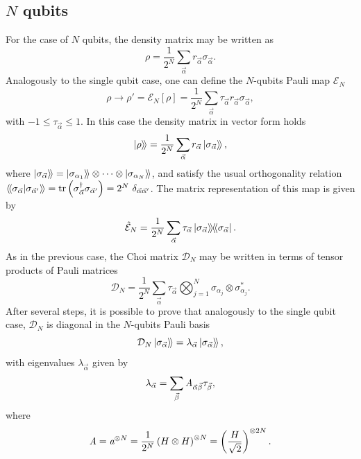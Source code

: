 \subsection{$N$ qubits} %
% 
For the case of $N$ qubits, the density matrix may be written as
% 
\begin{equation}
\rho=\frac{1}{2^N}\sum_{\vec{\alpha}} r_{\vec{\alpha}} \sigma_{\vec{\alpha}}.
\end{equation}
% 
Analogously to the single qubit case, one can define the $N$-qubits Pauli map $\mathcal{E}_N$
% 
\begin{equation}
\rho \to \rho'=\mathcal{E}_N[\rho ]=\frac{1}{2^N}\sum_{\vec{\alpha}} \tau_{\vec{\alpha}} r_{\vec{\alpha}} \sigma_{\vec{\alpha}},
\end{equation}
% 
with $-1\leq \tau_{\vec{\alpha}} \leq 1$. 
% 
In this case the density matrix in vector form holds 
% 
\begin{equation}
 \mathinner{|{\rho}\rangle \! \rangle}=\frac{1}{2^N}\sum_{\vec{\alpha}} r_{\vec{\alpha}} \mathinner{|{\sigma_{\vec{\alpha}} }\rangle \! \rangle},
\end{equation}
% 
where $\mathinner{|{\sigma_{\vec{\alpha} }}\rangle \! \rangle}=\mathinner{|{\sigma_{\alpha_1}}\rangle \! \rangle}\otimes\dots \otimes\mathinner{|{\sigma_{\alpha_N}}\rangle \! \rangle}$, and satisfy the usual orthogonality relation $\mathinner{\langle\!\langle {{\sigma_{\vec{\alpha} } }}|{{\sigma_{\vec{\alpha}'} }}\rangle\!\rangle} = \tr \left(\sigma_{\vec{\alpha}}^{\dagger} \sigma_{\vec{\alpha}'}\right) = 2^N ~\delta_{\vec{\alpha}\vec{\alpha}'}$. The matrix representation of this map is given by
% 
\begin{equation}
\hat{\mathcal{E}}_N = \frac{1}{2^N}\sum_{\vec{\alpha}} \tau_{\vec{\alpha}} \mathinner{|{\sigma_{\vec{\alpha}} }\rangle\!\rangle\!\langle\!\langle{\sigma_{\vec{\alpha}} }|}.
\end{equation}
%
As in the previous case, the Choi matrix $\mathcal{D}_N$ may be written in terms of tensor products of Pauli matrices
% 
\begin{equation}
 \mathcal{D}_N = \frac{1}{2^N}\sum_{\vec{\alpha}} \tau_{\vec{\alpha}}  \bigotimes_{j=1}^N \sigma_{\alpha_j} \otimes \sigma_{\alpha_j}^*.
\end{equation}
% 
After several steps, it is possible to prove that analogously to the single qubit case, $\mathcal{D}_N$ is diagonal in the $N$-qubits Pauli basis
%
\begin{equation}
 \mathcal{D}_N \mathinner{|{\sigma_{\vec{\alpha} }}\rangle \! \rangle}= \lambda_{\vec{\alpha}} \mathinner{|{\sigma_{\vec{\alpha} }}\rangle \! \rangle},
\end{equation}
% 
with eigenvalues $\lambda_{\vec{\alpha}}$ given by 
% 
\begin{equation}
 \lambda_{\vec{\alpha}} = \sum_{\vec{\beta}} \textit{A}_{\vec{\alpha}\vec{\beta}}\tau_{\vec{\beta}},
\end{equation}
%
where 
% 
\begin{equation}
 \textit{A}=\textit{a}^{\otimes N}=\frac{1}{2^N}\left(H\otimes H\right)^{\otimes N}=\left(\frac{H}{\sqrt{2}}\right)^{\otimes 2N}.
\end{equation}
%
